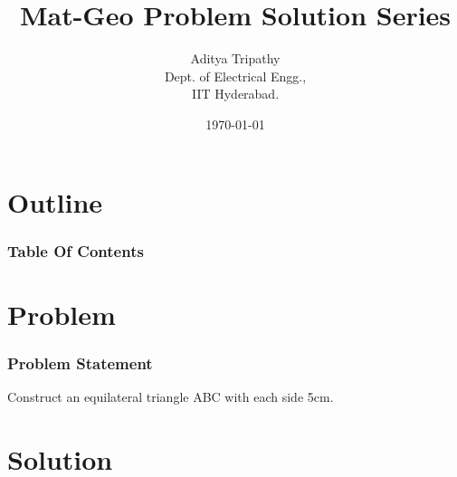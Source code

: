 \documentclass{beamer}
\title{Mat-Geo Problem Solution Series}
\author{Aditya Tripathy\\ Dept. of Electrical Engg.,\\IIT Hyderabad.}
\date{\today}
\theoremstyle{remark}
\newcommand{\myvec}[1]{\ensuremath{\begin{pmatrix}#1\end{pmatrix}}}
\let\vec\mathbf
\numberwithin{equation}{section}
\begin{document}
\begin{frame}
\titlepage
\end{frame}

\section*{Outline}
\begin{frame}
\frametitle{Table Of Contents}
\tableofcontents
\end{frame}
\section{Problem}
\begin{frame}
\frametitle{Problem Statement}
%

Construct an equilateral triangle ABC with each side 5cm.
\end{frame}

\section{Solution}
\end{document}
